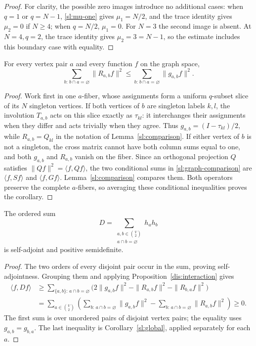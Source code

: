 \begin{proof}
For clarity, the possible zero images introduce no additional cases:
when $q=1$ or $q=N-1$, \eqref{sl:mu-one} gives $\mu_1=N/2$, and the trace
identity gives $\mu_2=0$ if $N\ge4$; when $q=N/2$, $\mu_1=0$.
For $N=3$ the second image is absent. At $N=4,q=2$, the trace identity gives
$\mu_2=3=N-1$, so the estimate includes this boundary case with equality.
\end{proof}

\begin{corollary}
\label{sl:global}
For every vertex pair $a$ and every function $f$ on the graph space,
\begin{equation}
 \sum_{b:\,b\cap a=\varnothing}\|R_{a,b}f\|^2
 \le
 \sum_{b:\,b\cap a=\varnothing}\|g_{a,b}f\|^2.
 \label{sl:graph-comparison}
\end{equation}
\end{corollary}

\begin{proof}
Work first in one $a$-fiber, whose assignments form a uniform $q$-subset
slice of its $N$ singleton vertices. If both vertices of $b$ are singleton
labels $k,l$, the involution $T_{a,b}$ acts on this slice exactly as
$\tau_{kl}$: it interchanges their assignments when they differ and acts
trivially when they agree. Thus $g_{a,b}=(I-\tau_{kl})/2$, while
$R_{a,b}=Q_{kl}$ in the notation of Lemma~\ref{sl:comparison}.
If either vertex of $b$ is not a singleton, the cross matrix cannot have
both column sums equal to one, and both $g_{a,b}$ and $R_{a,b}$ vanish
on the fiber. Since an orthogonal projection $Q$ satisfies
$\|Qf\|^2=\langle f,Qf\rangle$, the two conditional sums in
\eqref{sl:graph-comparison} are $\langle f,Sf\rangle$ and
$\langle f,Gf\rangle$. Lemma~\ref{sl:comparison} compares them.
Both operators preserve the complete $a$-fibers, so averaging these
conditional inequalities proves the corollary.
\end{proof}

\begin{corollary}\label{dis:nonnegative}
The ordered sum
\begin{equation}\label{dis:D}
 D=\sum_{\substack{a,b\in\binom V2\\a\cap b=\varnothing}}h_a h_b
\end{equation}
is self-adjoint and positive semidefinite.
\end{corollary}

\begin{proof}
The two orders of every disjoint pair occur in the sum, proving
self-adjointness. Grouping them and applying
Proposition~\ref{dis:interaction} gives
\begin{align*}
 \langle f,Df\rangle
 &\ge\sum_{\{a,b\}:\,a\cap b=\varnothing}
       \bigl(2\|g_{a,b}f\|^2
             -\|R_{a,b}f\|^2-\|R_{b,a}f\|^2\bigr)\\
 &=\sum_{a\in\binom V2}
       \left(\sum_{b:\,a\cap b=\varnothing}\|g_{a,b}f\|^2
            -\sum_{b:\,a\cap b=\varnothing}\|R_{a,b}f\|^2\right)
 \ge0.
\end{align*}
The first sum is over unordered pairs of disjoint vertex pairs;
the equality uses $g_{a,b}=g_{b,a}$. The last inequality is
Corollary~\ref{sl:global}, applied separately for each $a$.
\end{proof}
